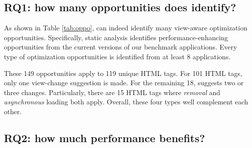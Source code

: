 \subsection{RQ1: how many opportunities does \Tool identify?}
\label{sec:rq1}
As shown in Table \ref{tab:oppo}, \Tool can indeed identify many view-aware
optimization opportunities.
Specifically, \Tool static analysis identifies   \numissues performance-enhancing
opportunities from the current versions of our benchmark applications. 
Every type of optimization 
opportunities is identified from at least 8 applications.

These 149 opportunities apply to 119 unique HTML tags. 
For 101 HTML tags, only one view-change suggestion is made.
For the remaining 18, \Tool suggests two or three changes.
Particularly, there are 15 HTML tags where {\it removal} and {\it asynchronous}
loading both apply. 
Overall,
these four types well complement each other.

\subsection {RQ2: how much performance benefits?}
\label{sec:rq2}

